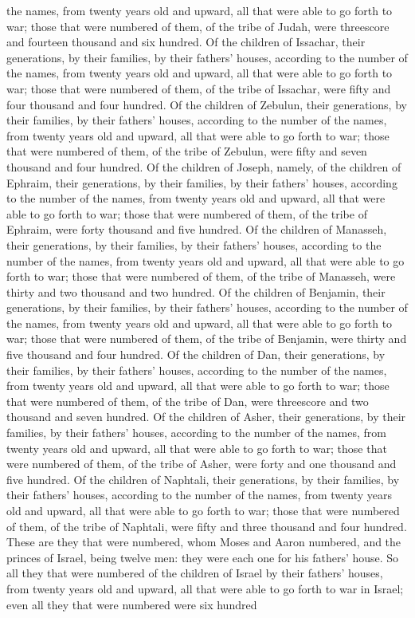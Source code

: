 the names, from twenty years old and upward, all that were able to go forth to war; those that were numbered of them, of the tribe of Judah, were threescore and fourteen thousand and six hundred.  Of the children of Issachar, their generations, by their families, by their fathers’ houses, according to the number of the names, from twenty years old and upward, all that were able to go forth to war; those that were numbered of them, of the tribe of Issachar, were fifty and four thousand and four hundred.  Of the children of Zebulun, their generations, by their families, by their fathers’ houses, according to the number of the names, from twenty years old and upward, all that were able to go forth to war; those that were numbered of them, of the tribe of Zebulun, were fifty and seven thousand and four hundred.  Of the children of Joseph, namely, of the children of Ephraim, their generations, by their families, by their fathers’ houses, according to the number of the names, from twenty years old and upward, all that were able to go forth to war; those that were numbered of them, of the tribe of Ephraim, were forty thousand and five hundred.  Of the children of Manasseh, their generations, by their families, by their fathers’ houses, according to the number of the names, from twenty years old and upward, all that were able to go forth to war; those that were numbered of them, of the tribe of Manasseh, were thirty and two thousand and two hundred.  Of the children of Benjamin, their generations, by their families, by their fathers’ houses, according to the number of the names, from twenty years old and upward, all that were able to go forth to war; those that were numbered of them, of the tribe of Benjamin, were thirty and five thousand and four hundred.  Of the children of Dan, their generations, by their families, by their fathers’ houses, according to the number of the names, from twenty years old and upward, all that were able to go forth to war; those that were numbered of them, of the tribe of Dan, were threescore and two thousand and seven hundred.  Of the children of Asher, their generations, by their families, by their fathers’ houses, according to the number of the names, from twenty years old and upward, all that were able to go forth to war; those that were numbered of them, of the tribe of Asher, were forty and one thousand and five hundred.  Of the children of Naphtali, their generations, by their families, by their fathers’ houses, according to the number of the names, from twenty years old and upward, all that were able to go forth to war; those that were numbered of them, of the tribe of Naphtali, were fifty and three thousand and four hundred.  These are they that were numbered, whom Moses and Aaron numbered, and the princes of Israel, being twelve men: they were each one for his fathers’ house. So all they that were numbered of the children of Israel by their fathers’ houses, from twenty years old and upward, all that were able to go forth to war in Israel; even all they that were numbered were six hundred 
